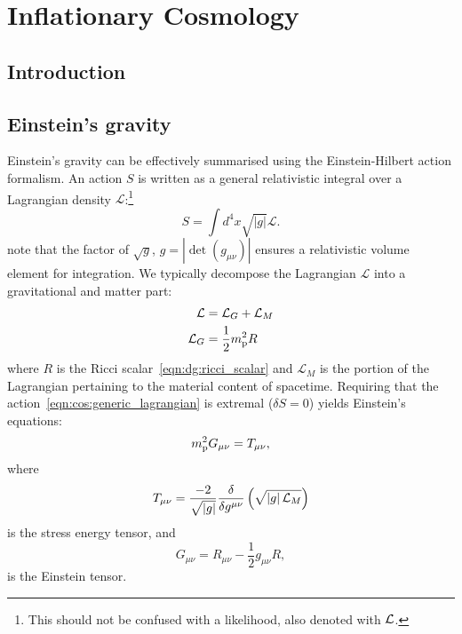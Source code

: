 \chapter{Inflationary Cosmology}
\label{chap:cos}

\section{Introduction}
\label{sec:cos:intro}

\section{Einstein's gravity}
\label{sec:cos:einsteins_gravity}

Einstein's gravity can be effectively summarised using the Einstein-Hilbert action formalism. An action $S$ is written as a general relativistic integral over a Lagrangian density $\mathcal{L}$:\footnote{This should not be confused with a likelihood, also denoted with $\mathcal{L}$.}
\begin{equation}
  S = \int d^4 x \sqrt{|g|} \mathcal{L}.
  \label{eqn:cos:generic_lagrangian}
\end{equation}
note that the factor of $\sqrt{g}$, $g=\left|\det\left( g_{\mu\nu} \right)\right|$ ensures a relativistic volume element for integration.
We typically decompose the Lagrangian $\mathcal{L}$ into a gravitational and matter part:
\begin{align}
  \mathcal{L} &= \mathcal{L}_G + \mathcal{L}_M
  \label{eqn:cos:decomp}\\
  \mathcal{L}_G &= \frac{1}{2} m_{\mathrm{p}}^2 R
  \label{eqn:cos:L_grav}
\end{align}
where $R$ is the Ricci scalar~\eqref{eqn:dg:ricci_scalar} and $\mathcal{L}_M$ is the portion of the Lagrangian pertaining to the material content of spacetime. Requiring that the action~\eqref{eqn:cos:generic_lagrangian} is extremal ($\delta S = 0$) yields Einstein's equations:
\begin{equation}
 m_{\mathrm{p}}^2 G_{\mu\nu} = T_{\mu\nu},
  \label{eqn:cos:einsteins_equations}
\end{equation}
where
\begin{equation}
  T_{\mu\nu} = \frac{-2}{\sqrt{\left|g\right|}}\frac{\delta}{\delta g^{\mu\nu}}\left( \sqrt{\left|g\right| \mathcal{L}_M} \right)
  \label{eqn:cos:SET_fundamantal}
\end{equation}
is the stress energy tensor, and
\begin{equation}
  G_{\mu\nu} = R_{\mu\nu} - \frac{1}{2}g_{\mu\nu} R,
  \label{eqn:cos:einstein_tensor}
\end{equation}
is the Einstein tensor.


